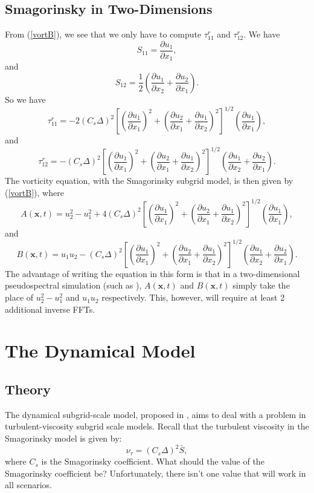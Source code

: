 \documentclass[11pt,a4paper]{article}
\newcommand{\eq}[1]{(\ref{#1})}
\begin{document}
\subsection{Smagorinsky in Two-Dimensions}
From \eq{vortB}, we see that we only have to compute $\tau^r_{11}$ and $\tau^r_{12}$. We have 
$${S}_{11} = \frac{\partial {u}_1}{\partial x_1},$$
and
$${S}_{12} = \frac{1}{2}\left( \frac{\partial {u}_1}{\partial x_2} + \frac{\partial {u}_2}{\partial x_1}\right).$$
So we have
\begin{equation}\label{tau11}
\tau_{11}^r= -2(C_s \Delta)^2\left[\left( \frac{\partial {u}_1}{\partial x_1}\right)^2+\left( \frac{\partial {u}_2}{\partial x_1} + \frac{\partial {u}_1}{\partial x_2}\right)^2 \right]^{1/2}\left(\frac{\partial {u}_1}{\partial x_1}\right),
\end{equation}
and
\begin{equation}\label{tau12}
\tau_{12}^r= -(C_s \Delta)^2\left[\left( \frac{\partial {u}_1}{\partial x_1}\right)^2+\left( \frac{\partial {u}_2}{\partial x_1} + \frac{\partial {u}_1}{\partial x_2}\right)^2 \right]^{1/2}\left( \frac{\partial {u}_1}{\partial x_2} + \frac{\partial {u}_2}{\partial x_1}\right).
\end{equation}
The vorticity equation, with the Smagorinsky subgrid model, is then given by \eq{vortB}, where
$$A(\boldsymbol{x}, t) = u_2^2 - u_1^2 + 4(C_s \Delta)^2\left[\left( \frac{\partial {u}_1}{\partial x_1}\right)^2+\left( \frac{\partial {u}_2}{\partial x_1} + \frac{\partial {u}_1}{\partial x_2}\right)^2 \right]^{1/2}\left(\frac{\partial {u}_1}{\partial x_1}\right),$$
and
$$B(\boldsymbol{x}, t) = u_1u_2 -(C_s \Delta)^2\left[\left( \frac{\partial {u}_1}{\partial x_1}\right)^2+\left( \frac{\partial {u}_2}{\partial x_1} + \frac{\partial {u}_1}{\partial x_2}\right)^2 \right]^{1/2}\left( \frac{\partial {u}_1}{\partial x_2} + \frac{\partial {u}_2}{\partial x_1}\right).$$
The advantage of writing the equation in this form is that in a two-dimensional pseudospectral simulation (such as ), $A(\boldsymbol{x},t)$ and $B(\boldsymbol{x},t)$ simply take the place of $u_2^2 - u_1^2$ and $u_1u_2$ respectively. This, however, will require at least 2 additional inverse FFTs.
\section{The Dynamical Model}
\subsection{Theory}
The dynamical subgrid-scale model, proposed in \cite{GermanoEtAl1991}, aims to deal with a problem in turbulent-viscosity subgrid scale models. Recall that the turbulent viscosity in the Smagorinsky model is given by:
$$\nu_\tau = (C_s\Delta)^2\bar{S},$$
where $C_s$ is the Smagorinsky coefficient. What should the value of the Smagorinsky coefficient be? Unfortunately, there isn't one value that will work in all scenarios. 
\end{document}
